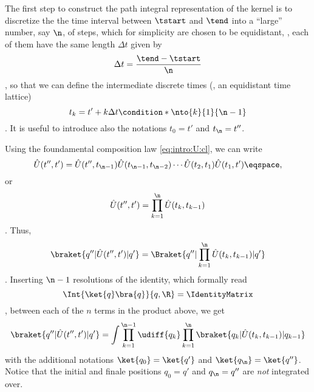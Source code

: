 The  first step to construct the path integral representation of the kernel is to discretize the the time interval between $\tstart$ and
$\tend$
into a ``large'' number, say $\n$, of steps, which for simplicity are chosen to be
equidistant, \ie, each of them have the same length $\Delta t $ given by
\begin{dmath*}
\Delta t  = \frac{\tend - \tstart}{\n} 
\end{dmath*},
so that  we can define  the intermediate discrete times (\ie, an equidistant
time lattice)
\begin{dmath*}
   t_{k} = t' +  k \Delta t \condition*{\nto{k}{1}{\n-1}}
\end{dmath*}.
It is useful to introduce also the notations $t_{0} = t'$ and $ t_{\n}
= t''$.

Using  the foundamental
composition law \cref{eq:intro:U:cl}, we can write
\begin{dmath*}
\hat{U}(t'', t') = \hat{U}(t'', t_{\n-1}) \hat{U}(t_{\n-1}, t_{\n-2}) \cdots
\hat{U}(t_{2}, t_{1} ) \hat{U}(t_{1}, t') \eqspace ,
\end{dmath*}
or
\begin{dmath*}
\hat{U}(t'', t') = \prod_{k=1}^{\n} \hat{U} (t_{k}, t_{k-1}) 
\end{dmath*}.
Thus,
\begin{dmath*}
\braket{q''|\hat{U}(t'',t')|q'} = \Braket{q'' | \prod_{k=1}^{\n} \hat{U}(t_{k},
t_{k-1})| q'}  
\end{dmath*}.
Inserting $\n-1$ resolutions of the identity, which formally read
\begin{dmath*}
\Int{\ket{q} \bra{q}}{q,\R} = \IdentityMatrix
\end{dmath*},
between each of the $n$ terms in the product above, we get
\begin{dmath}[label={Uprod}, frame]
\braket{q''|\hat{U}(t'',t')| q'}  =
\int \prod_{k=1}^{\n-1} \udiff{q_{k}}  \prod_{k=1}^{\n}  \braket{ q_{k}
| \hat{U}(t_{k} , t_{k-1})|q_{k-1}} 
\end{dmath}
with the additional notations $\ket{q_{0}} = \ket{q'} $ and $\ket{q_{\n}} =
\ket{q''}$.  Notice that the initial and finale positions $q_{0}=q'$ and
$q_{\n}=q''$ are \emph{not} integrated over.

